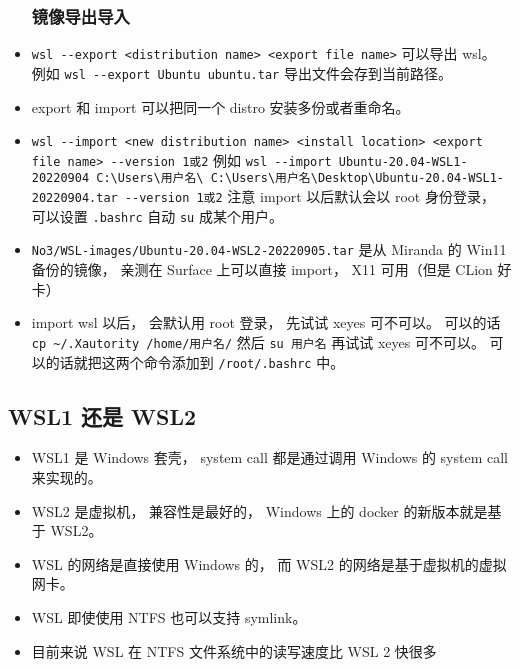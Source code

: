 \begin{itemize}
\subsubsection{镜像导出导入}
\item \verb`wsl --export <distribution name> <export file name>` 可以导出 wsl。 例如 \verb`wsl --export Ubuntu ubuntu.tar` 导出文件会存到当前路径。
\item export 和 import 可以把同一个 distro 安装多份或者重命名。
\item \verb`wsl --import <new distribution name> <install location> <export file name> --version 1或2` 例如 \verb`wsl --import Ubuntu-20.04-WSL1-20220904 C:\Users\用户名\ C:\Users\用户名\Desktop\Ubuntu-20.04-WSL1-20220904.tar --version 1或2` 注意 import 以后默认会以 root 身份登录， 可以设置 \verb`.bashrc` 自动 \verb`su` 成某个用户。
\item \verb`No3/WSL-images/Ubuntu-20.04-WSL2-20220905.tar` 是从 Miranda 的 Win11 备份的镜像， 亲测在 Surface 上可以直接 import， X11 可用（但是 CLion 好卡）
\item import wsl 以后， 会默认用 root 登录， 先试试 xeyes 可不可以。 可以的话 \verb`cp ~/.Xautority /home/用户名/` 然后 \verb`su 用户名` 再试试 xeyes 可不可以。 可以的话就把这两个命令添加到 \verb`/root/.bashrc` 中。
\end{itemize}

\subsection{WSL1 还是 WSL2}
\begin{itemize}
\item WSL1 是 Windows 套壳， system call 都是通过调用 Windows 的 system call 来实现的。
\item WSL2 是虚拟机， 兼容性是最好的， Windows 上的 docker 的新版本就是基于 WSL2。
\item WSL 的网络是直接使用 Windows 的， 而 WSL2 的网络是基于虚拟机的虚拟网卡。
\item WSL 即使使用 NTFS 也可以支持 symlink。
\item 目前来说 WSL 在 NTFS 文件系统中的读写速度比 WSL 2 快很多
\end{itemize}

